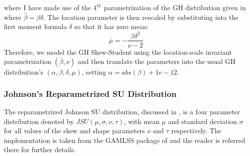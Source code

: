 where I have made use of the $4^{th}$ parametrization of the GH distribution given in
\cite{Prause1999} where $\hat \beta = \beta \delta$. The location parameter is then rescaled
by substituting into the first moment formula $\delta$ so that it has zero mean:
\begin{equation}
\bar \mu  =  - \frac{{\beta {\delta ^2}}}{{\nu  - 2}}
\end{equation}
Therefore, we model the GH Skew-Student using the location-scale invariant parametrization $(\bar \beta, \nu)$
and then translate the parameters into the usual GH distribution's $(\alpha, \beta, \delta, \mu)$, setting
$\alpha = abs(\beta)+1e-12$.
\subsubsection{Johnson's Reparametrized SU Distribution}\label{jsu}
The reparametrized Johnson SU distribution, discussed in \cite{Rigby2005}, is a
four parameter distribution denoted by $JSU\left(\mu,\sigma,\nu,\tau\right)$,
with mean $\mu$ and standard deviation $\sigma$ for all values of the skew and
shape parameters $\nu$ and $\tau$ respectively. The implementation is taken
from the GAMLSS package of \cite{Stasinopoulos2009} and the reader is referred
there for further details.

